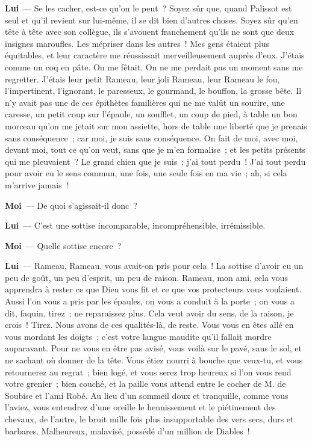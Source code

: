 \documentclass[french,twoside]{book} %
\newcommand{\labelchar}[1]{\textbf{\color{rubric} #1}}
\begin{document}
\labelchar{Lui} — Se les cacher, est-ce qu’on le peut ? Soyez sûr que, quand Palissot est seul et qu’il revient sur lui-même, il se dit bien d’autres choses. Soyez sûr qu’en tête à tête avec son collègue, ils s’avouent franchement qu’ils ne sont que deux insignes maroufles. Les mépriser dans les autres ! Mes gens étaient plus équitables, et leur caractère me réussissait merveilleusement auprès d’eux. J’étais comme un coq en pâte. On me fêtait. On ne me perdait pas un moment sans me regretter. J’étais leur petit Rameau, leur joli Rameau, leur Rameau le fou, l’impertinent, l’ignorant, le paresseux, le gourmand, le bouffon, la grosse bête. Il n’y avait pas une de ces épithètes familières qui ne me valût un sourire, une caresse, un petit coup sur l’épaule, un soufflet, un coup de pied, à table un bon morceau qu’on me jetait sur mon assiette, hors de table une liberté que je prenais sans conséquence ; car moi, je suis sans conséquence. On fait de moi, avec moi, devant moi, tout ce qu’on veut, sans que je m’en formalise ; et les petits présents qui me pleuvaient ? Le grand chien que je suis ; j’ai tout perdu ! J’ai tout perdu pour avoir eu le sens commun, une fois, une seule fois en ma vie ; ah, si cela m’arrive jamais !\par
\labelchar{Moi} — De quoi s’agissait-il donc ?\par
\labelchar{Lui} — C’est une sottise incomparable, incompréhensible, irrémissible.\par
\labelchar{Moi} — Quelle sottise encore ?\par
\labelchar{Lui} — Rameau, Rameau, vous avait-on pris pour cela ! La sottise d’avoir eu un peu de goût, un peu d’esprit, un peu de raison. Rameau, mon ami, cela vous apprendra à rester ce que Dieu vous fit et ce que vos protecteurs vous voulaient. Aussi l’on vous a pris par les épaules, on vous a conduit à la porte ; on vous a dit, faquin, tirez ; ne reparaissez plus. Cela veut avoir du sens, de la raison, je crois ! Tirez. Nous avons de ces qualités-là, de reste. Vous vous en êtes allé en vous mordant les doigts ; c’est votre langue maudite qu’il fallait mordre auparavant. Pour ne vous en être pas avisé, vous voilà sur le pavé, sans le sol, et ne sachant où donner de la tête. Vous étiez nourri à bouche que veux-tu, et vous retournerez au regrat ; bien logé, et vous serez trop heureux si l’on vous rend votre grenier ; bien couché, et la paille vous attend entre le cocher de M. de Soubise et l’ami Robé. Au lieu d’un sommeil doux et tranquille, comme vous l’aviez, vous entendrez d’une oreille le hennissement et le piétinement des chevaux, de l’autre, le bruit mille fois plus insupportable des vers secs, durs et barbares. Malheureux, malavisé, possédé d’un million de Diables !\par
\end{document}
